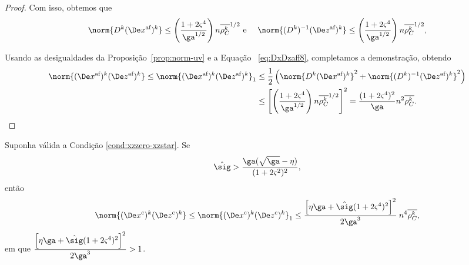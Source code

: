 \begin{proof}
Com isso, obtemos que 
	\begin{equation}\label{eq:DxDzaff8}
		\norm{\Dk  \dekx }\leq \left(\frac{1 + 2\bdxzstar^{4} }{\ga^{1/2}}\right) n\rhoCkb ^{1/2}\text{ e } \quad  \norm{\Dik  \dekz  }\leq \left(\frac{1 + 2\bdxzstar^{4} }{\ga^{1/2}}\right)n\rhoCkb ^{1/2},
		\end{equation}




Usando as desigualdades da Proposição~\ref{prop:norm-uv} e  a Equação ~\eqref{eq:DxDzaff8}, completamos a demonstração, obtendo 
\begin{align}
	\norm{ \dekx  \dekz  } \leq \norm{ \dekx  \dekz  }_{1}   & \leq \frac{1}{2}\left(\norm{\Dk \dekx}^{2} + \norm{\Dik  \dekz  }^{2}\right) \notag
  					\\ 
  					& \leq \left[\left(\frac{1 + 2\bdxzstar^{4} }{\ga^{1/2}}\right)  n\rhoCkb ^{1/2}\right]^{2}
  				= \frac{(1 + 2\bdxzstar^{4})^{2} }{\ga} n^{2}\rhoCkb . \qedhere
  				 \label{eq:normDxDzaff}
\end{align}

\end{proof}

\begin{lema}\label{lemma:boundDxDzc}
Suponha válida a Condição  \ref{cond:xzzero-xzstar}. Se  \begin{equation}
	\label{eq:sig-eta-relation}
	\nextsig > \frac{\ga(\sqrt{\ga} - \eta)}{(1+2\bdxzstar^{2})^{2}},
\end{equation} então  
	\begin{equation}\label{eq:lemma-boundDxDzcx}
		\norm{ \Dekcox  \Dekcoz  } \leq \norm{ \Dekcox  \Dekcoz  }_{1} \leq \dfrac{\left[\eta\ga + \nextsig(1+2\bdxzstar^{4})^{2}\right]^{2}}{2\ga^{3}} \: n^{4}\rhoCkb ,
	\end{equation}
	em que $\dfrac{\left[\eta\ga + \nextsig(1+2\bdxzstar^{4})^{2}\right]^{2}}{2\ga^{3}} > \num{1}$.
\end{lema}




